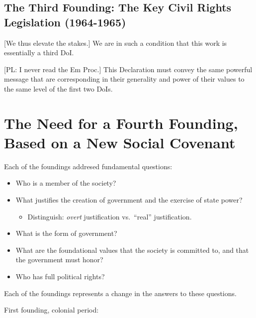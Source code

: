 \documentclass[
]{book}
\providecommand{\tightlist}{%
  \setlength{\itemsep}{0pt}\setlength{\parskip}{0pt}}
\begin{document}
\hypertarget{the-third-founding-the-key-civil-rights-legislation-1964-1965}{%
\subsection{The Third Founding: The Key Civil Rights Legislation (1964-1965)}\label{the-third-founding-the-key-civil-rights-legislation-1964-1965}}

{[}We thus elevate the stakes.{]} We are in such a condition that this work is essentially a third DoI.

{[}PL: I never read the Em Proc.{]} This Declaration must convey the same powerful message that are corresponding in their generality and power of their values to the same level of the first two DoIs.

\hypertarget{the-need-for-a-fourth-founding-based-on-a-new-social-covenant}{%
\section{The Need for a Fourth Founding, Based on a New Social Covenant}\label{the-need-for-a-fourth-founding-based-on-a-new-social-covenant}}

Each of the foundings addresed fundamental questions:

\begin{itemize}
\item
  Who is a member of the society?
\item
  What justifies the creation of government and the exercise of state power?

  \begin{itemize}
  \tightlist
  \item
    Distinguish: \emph{overt} justification vs.~``real'' justification.
  \end{itemize}
\item
  What is the form of government?
\item
  What are the foundational values that the society is committed to, and that the government must honor?
\item
  Who has full political rights?
\end{itemize}

Each of the foundings represents a change in the answers to these questions.

First founding, colonial period:
\end{document}
